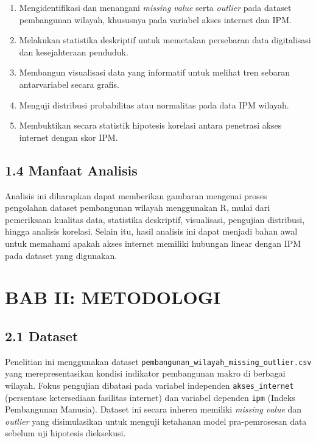 \documentclass[
  indonesian,
  letterpaper,
  DIV=11,
  numbers=noendperiod]{scrartcl}
\providecommand{\tightlist}{%
  \setlength{\itemsep}{0pt}\setlength{\parskip}{0pt}}
\begin{document}
\begin{enumerate}
\def\labelenumi{\arabic{enumi}.}
\tightlist
\item
  Mengidentifikasi dan menangani \emph{missing value} serta
  \emph{outlier} pada dataset pembangunan wilayah, khususnya pada
  variabel akses internet dan IPM.
\item
  Melakukan statistika deskriptif untuk memetakan persebaran data
  digitalisasi dan kesejahteraan penduduk.
\item
  Membangun visualisasi data yang informatif untuk melihat tren sebaran
  antarvariabel secara grafis.
\item
  Menguji distribusi probabilitas atau normalitas pada data IPM wilayah.
\item
  Membuktikan secara statistik hipotesis korelasi antara penetrasi akses
  internet dengan skor IPM.
\end{enumerate}

\subsection{1.4 Manfaat Analisis}\label{manfaat-analisis}

Analisis ini diharapkan dapat memberikan gambaran mengenai proses
pengolahan dataset pembangunan wilayah menggunakan R, mulai dari
pemeriksaan kualitas data, statistika deskriptif, visualisasi, pengujian
distribusi, hingga analisis korelasi. Selain itu, hasil analisis ini
dapat menjadi bahan awal untuk memahami apakah akses internet memiliki
hubungan linear dengan IPM pada dataset yang digunakan.

\section{BAB II: METODOLOGI}\label{bab-ii-metodologi}

\subsection{2.1 Dataset}\label{dataset}

Penelitian ini menggunakan dataset
\texttt{pembangunan\_wilayah\_missing\_outlier.csv} yang
merepresentasikan kondisi indikator pembangunan makro di berbagai
wilayah. Fokus pengujian dibatasi pada variabel independen
\texttt{akses\_internet} (persentase ketersediaan fasilitas internet)
dan variabel dependen \texttt{ipm} (Indeks Pembangunan Manusia). Dataset
ini secara inheren memiliki \emph{missing value} dan \emph{outlier} yang
disimulasikan untuk menguji ketahanan model pra-pemrosesan data sebelum
uji hipotesis dieksekusi.
\end{document}
